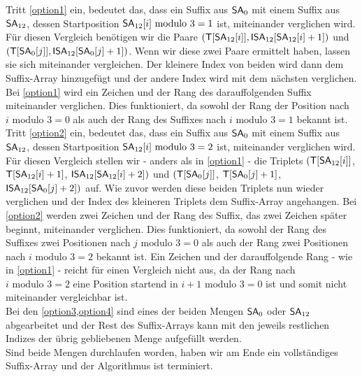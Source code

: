 Tritt \cref{option1} ein, bedeutet das, dass ein Suffix aus $\sa_{0}$ mit einem Suffix aus $\sa_{12}$, dessen Startposition $\sa_{12}[i] \text{ modulo } 3 = 1$ ist, miteinander verglichen wird. Für diesen Vergleich benötigen wir die Paare $(\inputtext[\sa_{12}[i]], \isa_{12}[\sa_{12}[i]+1])$ und $(\inputtext[\sa_{0}[j]], \isa_{12}[\sa_{0}[j]+1])$. Wenn wir diese zwei Paare ermittelt haben, lassen sie sich miteinander vergleichen. Der kleinere Index von beiden wird dann dem Suffix-Array \sa hinzugefügt und der andere Index wird mit dem nächsten verglichen. Bei \cref{option1} wird ein Zeichen und der Rang des darauffolgenden Suffix miteinander verglichen. Dies funktioniert, da sowohl der Rang der Position nach $i \text{ modulo } 3 = 0$ als auch der Rang des Suffixes nach $i \text{ modulo } 3 = 1$ bekannt ist. \\
Tritt \cref{option2} ein, bedeutet das, dass ein Suffix aus $\sa_{0}$ mit einem Suffix aus $\sa_{12}$, dessen Startposition $\sa_{12}[i] \text{ modulo } 3 = 2$ ist, miteinander verglichen wird. Für diesen Vergleich stellen wir - anders als in \cref{option1} - die Triplets $(\inputtext[\sa_{12}[i]]$, $\inputtext[\sa_{12}[i]+1]$, $\isa_{12}[\sa_{12}[i]+2])$ und $(\inputtext[\sa_{0}[j]]$, $\inputtext[\sa_{0}[j]+1]$, $\isa_{12}[\sa_{0}[j]+2])$ auf. Wie zuvor werden diese beiden Triplets nun wieder verglichen und der Index des kleineren Triplets dem Suffix-Array angehangen. Bei \cref{option2} werden zwei Zeichen und der Rang des Suffix, das zwei Zeichen später beginnt, miteinander verglichen. Dies funktioniert, da sowohl der Rang des Suffixes zwei Positionen nach $j \text{ modulo } 3 = 0$ als auch der Rang zwei Positionen nach $i \text{ modulo } 3 = 2$ bekannt ist. Ein Zeichen und der darauffolgende Rang - wie in \cref{option1} - reicht für einen Vergleich nicht aus, da der Rang nach $i \text{ modulo } 3 = 2$ eine Position startend in $i+1 \text{ modulo } 3 = 0$ ist und somit nicht miteinander vergleichbar ist.\\
Bei den \cref{option3,option4} sind eines der beiden Mengen $\sa_{0}$ oder $\sa_{12}$ abgearbeitet und der Rest des Suffix-Arrays kann mit den jeweils restlichen Indizes der übrig gebliebenen Menge aufgefüllt werden.\\
Sind beide Mengen durchlaufen worden, haben wir am Ende ein vollständiges Suffix-Array und der Algorithmus ist terminiert.

